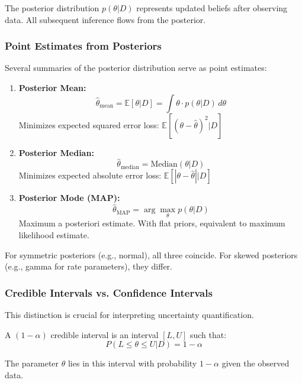 The posterior distribution $p(\theta | D)$ represents updated beliefs after observing data. All subsequent inference flows from the posterior.

\subsubsection{Point Estimates from Posteriors}

Several summaries of the posterior distribution serve as point estimates:

\begin{enumerate}
    \item \textbf{Posterior Mean:}
    \begin{equation}
    \hat{\theta}_{\text{mean}} = \mathbb{E}[\theta | D] = \int \theta \cdot p(\theta | D) \, d\theta
    \end{equation}
    Minimizes expected squared error loss: $\mathbb{E}[(\theta - \hat{\theta})^2 | D]$

    \item \textbf{Posterior Median:}
    \begin{equation}
    \hat{\theta}_{\text{median}} = \text{Median}(\theta | D)
    \end{equation}
    Minimizes expected absolute error loss: $\mathbb{E}[|\theta - \hat{\theta}| | D]$

    \item \textbf{Posterior Mode (MAP):}
    \begin{equation}
    \hat{\theta}_{\text{MAP}} = \arg\max_\theta p(\theta | D)
    \end{equation}
    Maximum a posteriori estimate. With flat priors, equivalent to maximum likelihood estimate.
\end{enumerate}

For symmetric posteriors (e.g., normal), all three coincide. For skewed posteriors (e.g., gamma for rate parameters), they differ.

\subsubsection{Credible Intervals vs. Confidence Intervals}

This distinction is crucial for interpreting uncertainty quantification.

\begin{definition}
A $(1-\alpha)$ credible interval is an interval $[L, U]$ such that:
\begin{equation}
P(L \leq \theta \leq U | D) = 1 - \alpha
\end{equation}

The parameter $\theta$ lies in this interval with probability $1-\alpha$ given the observed data.
\end{definition}

